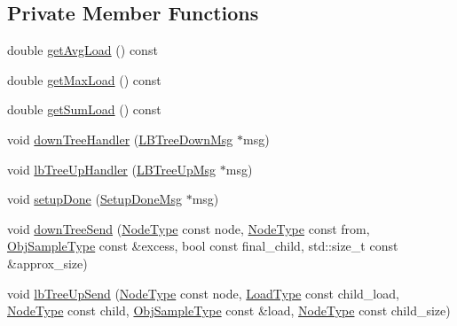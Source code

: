 \subsection*{Private Member Functions}
\begin{DoxyCompactItemize}
\item 
double \hyperlink{structvt_1_1vrt_1_1collection_1_1lb_1_1_hierarchical_l_b_a2fced8b5bbeeef2c150e66146cc77961}{get\+Avg\+Load} () const
\item 
double \hyperlink{structvt_1_1vrt_1_1collection_1_1lb_1_1_hierarchical_l_b_a32428a4c65c820d846e398270578d986}{get\+Max\+Load} () const
\item 
double \hyperlink{structvt_1_1vrt_1_1collection_1_1lb_1_1_hierarchical_l_b_a4cdebd4215afd2cac890525c7901f4ad}{get\+Sum\+Load} () const
\item 
void \hyperlink{structvt_1_1vrt_1_1collection_1_1lb_1_1_hierarchical_l_b_aa5e027cba0dfc9a1c7bc710e9932647a}{down\+Tree\+Handler} (\hyperlink{structvt_1_1vrt_1_1collection_1_1lb_1_1_l_b_tree_down_msg}{L\+B\+Tree\+Down\+Msg} $\ast$msg)
\item 
void \hyperlink{structvt_1_1vrt_1_1collection_1_1lb_1_1_hierarchical_l_b_a3b67d27c10a6a7532c9c5d1a57ab722a}{lb\+Tree\+Up\+Handler} (\hyperlink{structvt_1_1vrt_1_1collection_1_1lb_1_1_l_b_tree_up_msg}{L\+B\+Tree\+Up\+Msg} $\ast$msg)
\item 
void \hyperlink{structvt_1_1vrt_1_1collection_1_1lb_1_1_hierarchical_l_b_a52d7059862182d11f3fcb9683f7ac4a4}{setup\+Done} (\hyperlink{structvt_1_1vrt_1_1collection_1_1lb_1_1_setup_done_msg}{Setup\+Done\+Msg} $\ast$msg)
\item 
void \hyperlink{structvt_1_1vrt_1_1collection_1_1lb_1_1_hierarchical_l_b_aff832357cbb81dc17578c9f8876b7ecf}{down\+Tree\+Send} (\hyperlink{namespacevt_a866da9d0efc19c0a1ce79e9e492f47e2}{Node\+Type} const node, \hyperlink{namespacevt_a866da9d0efc19c0a1ce79e9e492f47e2}{Node\+Type} const from, \hyperlink{structvt_1_1vrt_1_1collection_1_1lb_1_1_base_l_b_a331d7da5bbf2883238427d86b54ddd7b}{Obj\+Sample\+Type} const \&excess, bool const final\+\_\+child, std\+::size\+\_\+t const \&approx\+\_\+size)
\item 
void \hyperlink{structvt_1_1vrt_1_1collection_1_1lb_1_1_hierarchical_l_b_a8a9d35f8b4a8cd21461209136e64ad30}{lb\+Tree\+Up\+Send} (\hyperlink{namespacevt_a866da9d0efc19c0a1ce79e9e492f47e2}{Node\+Type} const node, \hyperlink{structvt_1_1vrt_1_1collection_1_1lb_1_1_base_l_b_a215e22b9f12678303f49615ae3be05cc}{Load\+Type} const child\+\_\+load, \hyperlink{namespacevt_a866da9d0efc19c0a1ce79e9e492f47e2}{Node\+Type} const child, \hyperlink{structvt_1_1vrt_1_1collection_1_1lb_1_1_base_l_b_a331d7da5bbf2883238427d86b54ddd7b}{Obj\+Sample\+Type} const \&load, \hyperlink{namespacevt_a866da9d0efc19c0a1ce79e9e492f47e2}{Node\+Type} const child\+\_\+size)

\end{DoxyCompactItemize}
